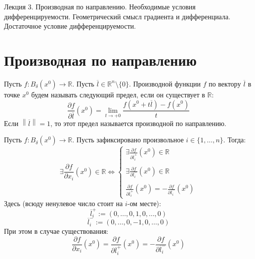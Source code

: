 \documentclass[11pt]{article}
\begin{document}
\begin{titlepage}
    \centering
    \vspace*{\fill}  %

    {\Huge Лекция 3. Производная по направлению. Необходимые условия дифференцируемости. 
    Геометрический смысл градиента и дифференциала. Достаточное условие дифференцируемости.
    \par}

    \vspace*{\fill}  %
\end{titlepage}

\setcounter{page}{1}

\section{Производная по направлению}

\begin{definition}
    Пусть $f \colon B_{\delta} \left(x^0\right) \to \mathbb{R}$. Пусть $\overline{l} \in \mathbb{R}^n \setminus \{0\}$. Производной функции $f$
    по вектору $\overline{l}$ в точке $x^0$ будем называть следующий предел, если он существует в $\mathbb{R}$:
    \[\frac{\partial f}{\partial \overline{l}} \left(x^0\right) = \lim_{t \to +0} \frac{f\left(x^0 + t \overline{l}\right) - f\left(x^0\right)}{t}\]
    Если $\left\lVert \overline{l} \right\rVert = 1$, то этот предел называется производной по направлению.
\end{definition}

\begin{theorem}
    Пусть $f \colon B_{\delta}\left(x^0\right) \to \mathbb{R}$. Пусть зафиксировано произвольное $i \in \{1, \ldots, n\}$. Тогда:
    \begin{equation*} \label{eq:th:1.1} \tag{$\ast$}
        \exists \frac{\partial f}{\partial x_i} \left(x^0\right) \in \mathbb{R} \iff
        \begin{cases}
            \exists \displaystyle \frac{\partial f}{\partial \overline{l}_i^{+}} \left(x^0\right) \in \mathbb{R} \\
            \\
            \exists \displaystyle \frac{\partial f}{\partial \overline{l}_i^{-}} \left(x^0\right) \in \mathbb{R} \\
            \\
            \displaystyle \frac{\partial f}{\partial \overline{l}_i^{+}} \left(x^0\right) = - \frac{\partial f}{\partial \overline{l}_i^{-}} \left(x^0\right)
        \end{cases}
    \end{equation*}
    Здесь (всюду ненулевое число стоит на $i$-ом месте):
    \[\overline{l}_i^{+} := (0, \ldots, 0, 1, 0, \ldots, 0)\]
    \[\overline{l}_i^{-} := (0, \ldots, 0, -1, 0, \ldots, 0)\]
    При этом в случае существования:
    \[ \frac{\partial f}{\partial x_i} \left(x^0\right) = \frac{\partial f}{\partial \overline{l}_i^{+}} \left(x^0\right) = - \frac{\partial f}{\partial \overline{l}_i^{-}} \left(x^0\right)\]
\end{theorem}
\end{document}
